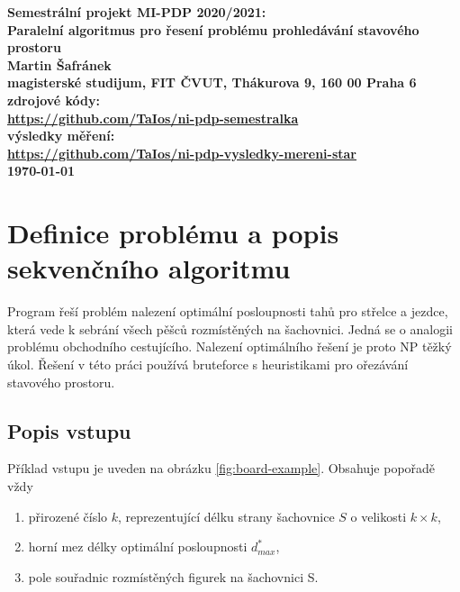 \documentclass{article}
\begin{document}
    \begin{center}
        \bf Semestrální projekt MI-PDP 2020/2021:\\[5mm]
        Paralelní algoritmus pro řesení problému prohledávání stavového prostoru\\[5mm]
        Martin Šafránek\\[2mm]
        magisterské studijum, FIT ČVUT, Thákurova 9, 160 00 Praha 6\\[2mm]
        zdrojové kódy:\\ \url{https://github.com/TaIos/ni-pdp-semestralka}\\[2mm]
        výsledky měření:\\ \url{https://github.com/TaIos/ni-pdp-vysledky-mereni-star}\\[2mm]
        \today
    \end{center}


    \label{sec:sequential}


    \section{Definice problému a popis sekvenčního algoritmu}

    Program řeší problém nalezení optimální posloupnosti tahů pro střelce a jezdce, která vede k sebrání
    všech pěšců rozmístěných na šachovnici. Jedná se o analogii problému obchodního cestujícího.
    Nalezení optimálního řešení je proto NP těžký úkol. Řešení v této práci používá bruteforce
    s heuristikami pro ořezávání stavového prostoru.
    \newline

    \label{subsec:popis-vstupu}

    \subsection{Popis vstupu}
    Příklad vstupu je uveden na obrázku \ref{fig:board-example}. Obsahuje popořadě vždy
    \begin{enumerate}
        \item přirozené číslo $k$, reprezentující délku strany šachovnice $S$ o velikosti $k \times k$,
        \item horní mez délky optimální posloupnosti $d^{*}_{max}$,
        \item pole souřadnic rozmístěných figurek na šachovnici S.
    \end{enumerate}
\end{document}
